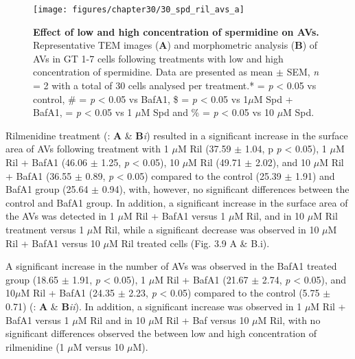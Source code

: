 {\begin{landscape}
\begin{figure}[!htbp]
\center
  \texttt{[image: figures/chapter30/30\_spd\_ril\_avs\_a]}
  \caption[Effect of low and high concentration of spermidine on AVs]{\textbf{Effect of low and high concentration of spermidine on AVs.} Representative TEM images (\textbf{A}) and morphometric analysis (\textbf{B}) of AVs in GT 1-7 cells following treatments with low and high concentration of spermidine. Data are presented as mean $\pm$ SEM, \textit{n} = 2 with a total of 30 cells analysed per treatment.* = \textit{p} < 0.05 vs control, \# = \textit{p} < 0.05 vs BafA1, \$ = \textit{p} < 0.05 vs 1$\mu$M Spd + BafA1, \@ = \textit{p} < 0.05 vs 1 $\mu$M Spd and  \% = \textit{p} < 0.05 vs 10 $\mu$M Spd.}
  \label{fig:30_spd_ril_avs_a}
\end{figure} 
\end{landscape}

Rilmenidine treatment (: \textbf{A} \& \textbf{B}\textit{i}) resulted in a significant increase in the surface area of AVs following treatment with 1 $\mu$M Ril (37.59 $\pm$ 1.04, p \textit{p} < 0.05), 1 $\mu$M Ril + BafA1 (46.06 $\pm$ 1.25, \textit{p} < 0.05), 10 $\mu$M Ril (49.71 $\pm$ 2.02), and 10 $\mu$M Ril + BafA1 (36.55 $\pm$ 0.89, \textit{p} < 0.05) compared to the control (25.39 $\pm$ 1.91) and BafA1 group (25.64 $\pm$ 0.94), with, however, no significant differences between the control and BafA1 group. In addition, a significant increase in the surface area of the AVs was detected in 1 $\mu$M Ril + BafA1 versus 1 $\mu$M Ril, and in 10 $\mu$M Ril treatment versus 1 $\mu$M Ril, while a significant decrease was observed in 10 $\mu$M Ril + BafA1 versus 10 $\mu$M Ril  treated cells (Fig. 3.9 A \& B.i).

A significant increase in the number of AVs was observed in the BafA1 treated group (18.65 $\pm$ 1.91, \textit{p} < 0.05), 1 $\mu$M Ril + BafA1 (21.67 $\pm$ 2.74, \textit{p} < 0.05), and 10$\mu$M Ril + BafA1 (24.35 $\pm$ 2.23, \textit{p} < 0.05) compared to the control (5.75 $\pm$ 0.71) (: \textbf{A} \& \textbf{B}\textit{ii}). In addition, a significant increase was observed in 1 $\mu$M Ril + BafA1 versus 1 $\mu$M Ril and in 10 $\mu$M Ril + Baf versus 10 $\mu$M Ril, with no significant differences observed the between low and high concentration of rilmenidine (1 $\mu$M versus 10 $\mu$M).

}
